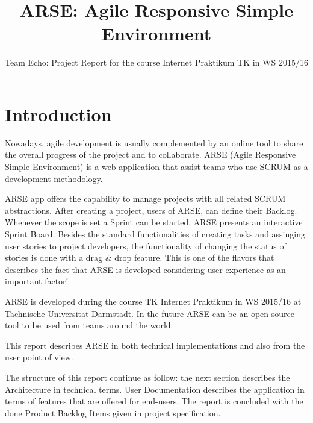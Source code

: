 \documentclass[
	accentcolor=tud1a %
]{tudreport}
\begin{document}
\title{ARSE: Agile Responsive Simple Environment}
\subtitle{Team Echo: Project Report for the course Internet Praktikum TK in WS 2015/16}

\maketitle

\tableofcontents

\chapter{Introduction}
\label{ch:introduction}

Nowadays, agile development is usually complemented by an online tool to share the overall progress of the project and to collaborate. ARSE (Agile Responsive Simple Environment) is a web application that assist teams who use SCRUM as a development methodology. 

ARSE app offers the capability to manage projects with all related SCRUM abstractions. After creating a project, users of ARSE, can define their Backlog. Whenever the scope is set a Sprint can be started. ARSE presents an interactive Sprint Board. Besides the standard functionalities of creating tasks and assinging user stories to project developers, the functionality of changing the status of stories is done with a drag \& drop feature. This is one of the flavors that describes the fact that ARSE is developed considering user experience as an important factor!

ARSE is developed during the course TK Internet Praktikum in WS 2015/16 at Tachnische Universitat Darmstadt. In the future ARSE can be an open-source tool to be used from teams around the world. 

This report describes ARSE in both technical implementations and also from the user point of view.

The structure of this report continue as follow: the next section describes the Architecture in technical terms. User Documentation describes the application in terms of features that are offered for end-users. The report is concluded with the done Product Backlog Items given in project specification. 
\end{document}
